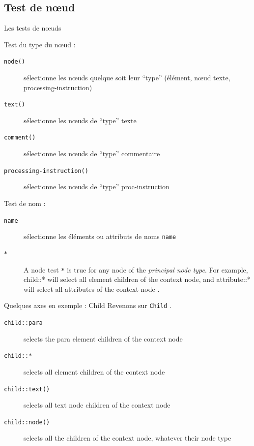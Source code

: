 \subsection{Test de n{\oe}ud}

\begin{frame}{Les tests de n{\oe}uds}

Test du type du n{\oe}ud :
\begin{description}
\item[\verb?node()?] sélectionne les nœuds quelque soit leur ``type'' (élément, n{\oe}ud texte, processing-instruction)
\item[\verb?text()?] sélectionne les n{\oe}uds de ``type'' texte
\item[\verb?comment()?] sélectionne les nœuds de ``type'' commentaire
\item[\verb?processing-instruction()?] sélectionne les nœuds de ``type'' proc-instruction
\end{description}

\medskip

Test de nom :
\begin{description}
\item[\verb?name?] sélectionne les éléments ou attributs de noms \texttt{name}
\item[\verb?*?] A node test \verb?*? is true for any node of the \textit{principal node type}. For example, child::* will select all element children of the context node, and attribute::* will select all attributes of the context node \cite{w3c/xpath}.
\end{description}

\end{frame}

\begin{frame}{Quelques axes en exemple : Child}
Revenons sur \texttt{Child} \cite{w3c/xpath}.

\begin{description}
\item[\verb?child::para?] selects the para element children of the context node

\item[\verb?child::*?] selects all element children of the context node

\item[\verb?child::text()?] selects all text node children of the context node

\item[\verb?child::node()?] selects all the children of the context node, whatever their node type
\end{description}


\end{frame}



